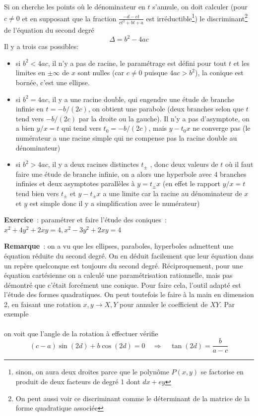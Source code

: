 \documentclass[a4paper,11pt]{book}
\begin{document}
\begin{giacjshere}
Si on cherche les points o\`u le d\'enominateur en $t$ s'annule, on doit
calculer  (pour $c\neq 0$ et en supposant que la fraction
$\frac{-d-et}{ct^2+bt+a}$ est irr\'eductible\footnote{sinon, on 
aura deux droites parce que le
polyn\^ome $P(x,y)$ se factorise en produit de deux facteurs
de degr\'e 1 dont $dx+ey$})
le discriminant\footnote{On peut aussi voir ce discriminant comme le
d\'eterminant de la matrice de la forme quadratique associ\'ee} 
de l'\'equation du second degr\'e
$$ \Delta= b^2-4ac$$
Il y a trois cas possibles: 
\begin{itemize}
\item si $b^2<4ac$, il n'y a pas de racine, le
param\'etrage est d\'efini pour tout $t$ et les limites en $\pm
\infty$ de $x$ sont nulles (car $c \neq 0$ puisque $4ac>b^2$),
la conique est born\'ee, c'est une ellipse.
\item si $b^2=4ac$, il y a une racine double, qui engendre
une \'etude de branche infinie en $t=-b/(2c)$, on
obtient une parabole (deux branches selon que $t$ tend
vers $-b/(2c)$ par la droite ou la gauche). Il n'y a pas
d'asymptote, on a bien $y/x=t$ qui tend vers $t_0=-b/(2c)$,
mais $y-t_0x$ ne converge pas (le num\'erateur a une racine simple
qui ne compense pas la racine double au d\'enominateur)
\item si $b^2>4ac$, il y a deux racines distinctes $t_\pm$ , 
donc deux valeurs de $t$ o\`u il faut faire une \'etude
de branche infinie, on a alors une
hyperbole
avec 4 branches infinies et deux asymptotes parall\`eles \`a
$y=t_\pm x$ (en effet le rapport $y/x=t$ tend bien
vers $t_\pm$ et $y-t_\pm x$ a une limite car la racine au
d\'enominateur de $x$ et $y$ est simple 
donc il y a simplification avec le num\'erateur)
\end{itemize}
{\bf Exercice}~: param\'etrer et faire l'\'etude des coniques~:\\
$x^2+4y^2+2xy=4, x^2-3y^2+2xy=4$

{\bf Remarque}~: 
on a vu que les ellipses, paraboles, hyperboles admettent une
\'equation r\'eduite du second degr\'e. On en d\'eduit facilement que
leur \'equation dans un rep\`ere quelconque est toujours
du second degr\'e. R\'eciproquement, pour une \'equation cart\'esienne
on a calcul\'e une param\'etrisation rationnelle, mais pas
d\'emontr\'e que c'\'etait forc\'ement une conique. Pour faire
cela, l'outil adapt\'e est l'\'etude des formes quadratiques. On peut
toutefois le faire \`a la main en dimension 2, en faisant une rotation
$x,y \rightarrow X,Y$ pour annuler le coefficient de $XY$. Par exemple\\
\\
on voit que l'angle de la rotation \`a effectuer v\'erifie
$$(c-a)\sin(2d)+b\cos(2d)=0 \quad \Rightarrow \quad \tan(2d)=\frac{b}{a-c}$$


\end{giacjshere}
\end{document}
